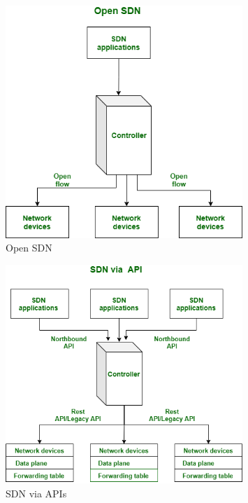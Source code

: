 \documentclass[en]{university}
\begin{document}
\begin{figure}
    \centering
    \includegraphics[width=0.8\textwidth]{resources/OpenSDNdrawio.png}
    \caption{Open SDN}
    \label{fig:open-sdn}
\end{figure}
\begin{figure}
    \centering
    \includegraphics[width=0.8\textwidth]{resources/SDNAPIdrawio.png}
    \caption{SDN via APIs}
    \label{fig:sdn-api}
\end{figure}
\end{document}
